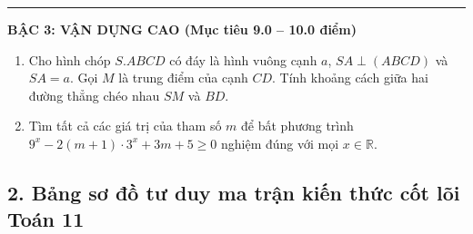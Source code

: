 \documentclass[12pt, a4paper]{article}
\begin{document}
\begin{tcolorbox}[enhanced, colback=white, colframe=blue!70!black, arc=1.5mm, title=\textbf{PHIẾU HỌC TẬP TỔNG HỢP: ÔN TẬP CUỐI NĂM TOÁN 11}]
\vspace{5pt}
\hrule
\vspace{5pt}

\textbf{\large BẬC 3: VẬN DỤNG CAO (Mục tiêu 9.0 -- 10.0 điểm)}
\begin{enumerate}[label=\textbf{Bài 3.\arabic*.}]
    \item Cho hình chóp $S.ABCD$ có đáy là hình vuông cạnh $a$, $SA \perp (ABCD)$ và $SA = a$. Gọi $M$ là trung điểm của cạnh $CD$. Tính khoảng cách giữa hai đường thẳng chéo nhau $SM$ và $BD$.
    \item Tìm tất cả các giá trị của tham số $m$ để bất phương trình $9^x - 2(m + 1) \cdot 3^x + 3m + 5 \ge 0$ nghiệm đúng với mọi $x \in \mathbb{R}$.
\end{enumerate}
\end{tcolorbox}

\vspace{5pt}

\subsection*{2. Bảng sơ đồ tư duy ma trận kiến thức cốt lõi Toán 11}
\end{document}

